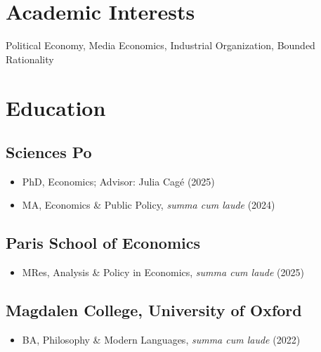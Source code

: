 \documentclass{cv_style}
\begin{document}


    \begin{center}  

    
	\end{center}
	
	\section{Academic Interests}
	Political Economy, Media Economics, Industrial Organization, Bounded Rationality

	\section{Education}
		\subsection{Sciences Po}
				\begin{itemize}
					\item PhD, Economics; Advisor: Julia Cagé (2025\textendash)
					\item MA, Economics \& Public Policy, \textit{summa cum laude} (2024) %
				\end{itemize}
                
		\subsection{Paris School of Economics}
				\begin{itemize}
					\item MRes, Analysis \& Policy in Economics, \textit{summa cum laude} (2025)
				\end{itemize}
				
		\subsection{Magdalen College, University of Oxford}
				\begin{itemize}
					\item BA, Philosophy \& Modern Languages, \textit{summa cum laude} (2022)
				\end{itemize}
		
\end{document}

